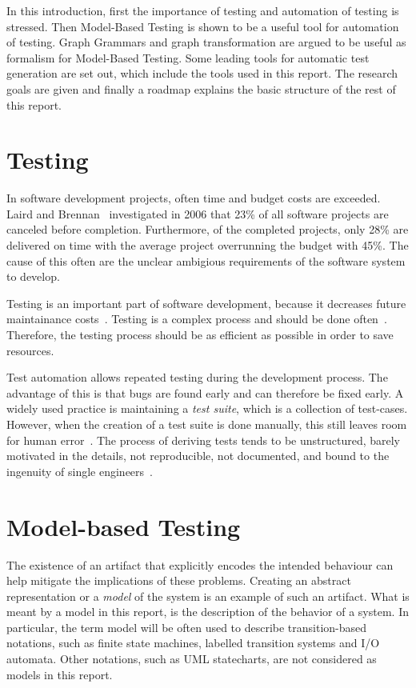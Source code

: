 In this introduction, first the importance of testing and automation of testing is stressed. Then Model-Based Testing is shown to be a useful tool for automation of testing. Graph Grammars and graph transformation are argued to be useful as formalism for Model-Based Testing. Some leading tools for automatic test generation are set out, which include the tools used in this report. The research goals are given and finally a roadmap explains the basic structure of the rest of this report.

\section{Testing}
In software development projects, often time and budget costs are exceeded. Laird and Brennan~\cite{Laird:SoftwareMeasurement} investigated in 2006 that 23\% of all software projects are canceled before completion. Furthermore, of the completed projects, only 28\% are delivered on time with the average project overrunning the budget with 45\%. The cause of this often are the unclear ambigious requirements of the software system to develop.

Testing is an important part of software development, because it decreases future maintainance costs~\cite{McConnell:testing}. Testing is a complex process and should be done often~\cite{Pol:testing}. Therefore, the testing process should be as efficient as possible in order to save resources.

Test automation allows repeated testing during the development process. The advantage of this is that bugs are found early and can therefore be fixed early.  A widely used practice is maintaining a \textit{test suite}, which is a collection of test-cases. However, when the creation of a test suite is done manually, this still leaves room for human error~\cite{Blackburn:testing}. The process of deriving tests tends to be unstructured, barely motivated in the details, not reproducible, not documented, and bound to the ingenuity of single engineers~\cite{Utting:MBTTaxonomy}.

\section{Model-based Testing}
The existence of an artifact that explicitly encodes the intended behaviour can help mitigate the implications of these problems. Creating an abstract representation or a \textit{model} of the system is an example of such an artifact. What is meant by a model in this report, is the description of the behavior of a system. In particular, the term model will be often used to describe transition-based notations, such as finite state machines, labelled transition systems and I/O automata. Other notations, such as UML statecharts, are not considered as models in this report. 

